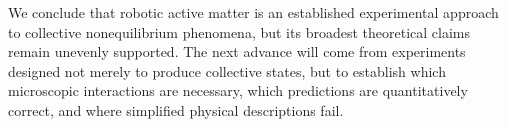 We conclude that robotic active matter
is an established experimental approach
to collective nonequilibrium phenomena,
but its broadest theoretical claims
remain unevenly supported. The next
advance will come from experiments
designed not merely to produce
collective states, but to establish
which microscopic interactions are
necessary, which predictions are
quantitatively correct, and where
simplified physical descriptions fail.